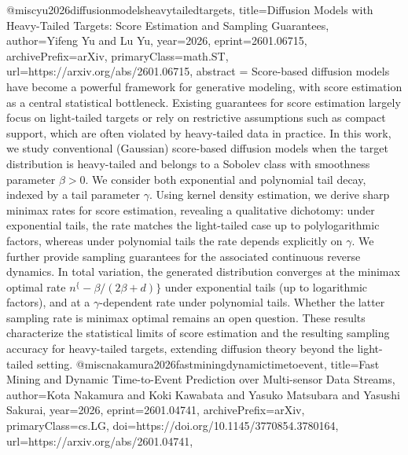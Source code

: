 {}@misc{yu2026diffusionmodelsheavytailedtargets,
      title={Diffusion Models with Heavy-Tailed Targets: Score Estimation and Sampling Guarantees}, 
      author={Yifeng Yu and Lu Yu},
      year={2026},
      eprint={2601.06715},
      archivePrefix={arXiv},
      primaryClass={math.ST},
      url={https://arxiv.org/abs/2601.06715},
      abstract = {Score-based diffusion models have become a powerful framework for generative modeling, with score estimation as a central statistical bottleneck. Existing guarantees for score estimation largely focus on light-tailed targets or rely on restrictive assumptions such as compact support, which are often violated by heavy-tailed data in practice. In this work, we study conventional (Gaussian) score-based diffusion models when the target distribution is heavy-tailed and belongs to a Sobolev class with smoothness parameter $β>0$. We consider both exponential and polynomial tail decay, indexed by a tail parameter $γ$. Using kernel density estimation, we derive sharp minimax rates for score estimation, revealing a qualitative dichotomy: under exponential tails, the rate matches the light-tailed case up to polylogarithmic factors, whereas under polynomial tails the rate depends explicitly on $γ$. We further provide sampling guarantees for the associated continuous reverse dynamics. In total variation, the generated distribution converges at the minimax optimal rate $n^\{-β/(2β+d)\}$ under exponential tails (up to logarithmic factors), and at a $γ$-dependent rate under polynomial tails. Whether the latter sampling rate is minimax optimal remains an open question. These results characterize the statistical limits of score estimation and the resulting sampling accuracy for heavy-tailed targets, extending diffusion theory beyond the light-tailed setting.}
}@misc{nakamura2026fastminingdynamictimetoevent,
      title={Fast Mining and Dynamic Time-to-Event Prediction over Multi-sensor Data Streams}, 
      author={Kota Nakamura and Koki Kawabata and Yasuko Matsubara and Yasushi Sakurai},
      year={2026},
      eprint={2601.04741},
      archivePrefix={arXiv},
      primaryClass={cs.LG},
      doi={https://doi.org/10.1145/3770854.3780164},
      url={https://arxiv.org/abs/2601.04741},
}
